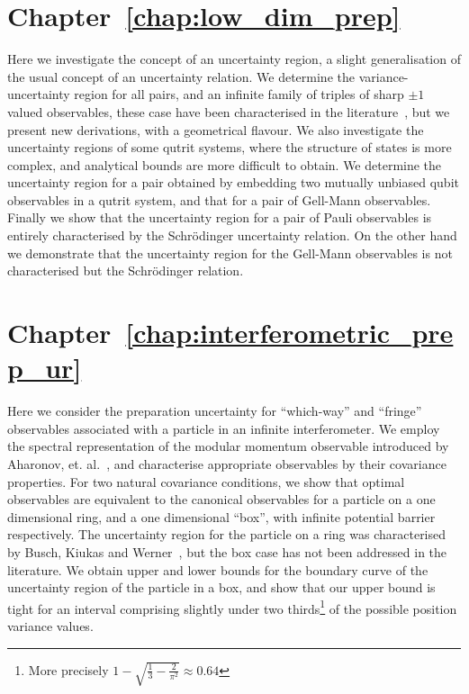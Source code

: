 \section*{Chapter~\ref{chap:low_dim_prep}}

Here we investigate the concept of an uncertainty region, a slight generalisation of the usual concept of an uncertainty relation. We determine the variance-uncertainty region for all pairs, and an infinite family of triples of sharp $\pm 1$ valued observables, these case have been characterised in the literature~\cites{LiQiao2015}{AbbottAlzieuHallBranciard2016}, but we present new derivations, with a geometrical flavour. We also investigate the uncertainty regions of some qutrit systems, where the structure of states is more complex, and analytical bounds are more difficult to obtain. We determine the uncertainty region for a pair obtained by embedding two mutually unbiased qubit observables in a qutrit system, and that for a pair of Gell-Mann observables. Finally we show that the uncertainty region for a pair of Pauli observables is entirely characterised by the Schr{\"o}dinger uncertainty relation. On the other hand we demonstrate that the uncertainty region for the Gell-Mann observables is not characterised but the Schr{\"o}dinger relation.

\section*{Chapter~\ref{chap:interferometric_prep_ur}}

Here we consider the preparation uncertainty for ``which-way'' and ``fringe'' observables associated with a particle in an infinite interferometer. We employ the spectral representation of the modular momentum observable introduced by Aharonov, et. al.~\cite{aharonov-modular-variables}, and characterise appropriate observables by their covariance properties. For two natural covariance conditions, we show that optimal observables are equivalent to the canonical observables for a particle on a one dimensional ring, and a one dimensional ``box'', with infinite potential barrier respectively. The uncertainty region for the particle on a ring was characterised by Busch, Kiukas and Werner~\cite{sharp-ur-num-angle}, but the box case has not been addressed in the literature. We obtain upper and lower bounds for the boundary curve of the uncertainty region of the particle in a box, and show that our upper bound is tight for an interval comprising slightly under two thirds\footnote{More precisely $1 - \sqrt{\frac{1}{3} - \frac{2}{\pi^2}} \approx 0.64$} of the possible position variance values.

